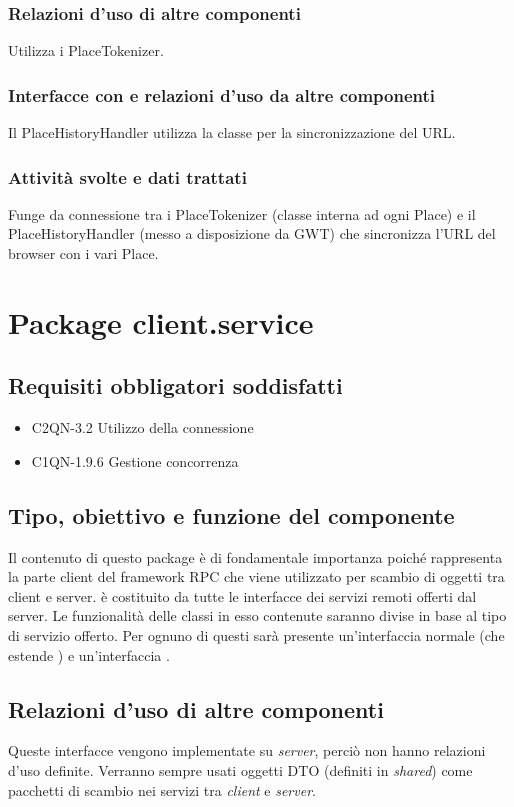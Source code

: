 \subsubsection*{Relazioni d'uso di altre componenti}
Utilizza i PlaceTokenizer.
\subsubsection*{Interfacce con e relazioni d'uso da altre componenti}
Il PlaceHistoryHandler utilizza la classe per la sincronizzazione del URL.
\subsubsection*{Attivit\`a svolte e dati trattati}
Funge da connessione tra i PlaceTokenizer (classe interna ad ogni Place) e il
PlaceHistoryHandler (messo a disposizione da GWT) che sincronizza l'URL del
browser con i vari Place.

\newpage
\section{Package client.service} %
\subsection*{Requisiti obbligatori soddisfatti}
\begin{itemize}
	\item C2QN-3.2 Utilizzo della connessione
	\item C1QN-1.9.6 Gestione concorrenza
\end{itemize}
\subsection*{Tipo, obiettivo e funzione del componente}
Il contenuto di questo package \`e di fondamentale importanza poich\'e
rappresenta la parte client del framework RPC che viene utilizzato per scambio
di oggetti tra client e server.  \`e costituito da tutte
le interfacce dei servizi remoti offerti dal server. Le funzionalit\`a delle
classi in esso contenute saranno divise in base al tipo di servizio offerto. Per
ognuno di questi sar\`a presente un'interfaccia normale (che estende
) e un'interfaccia .

\subsection*{Relazioni d'uso di altre componenti}
Queste interfacce vengono implementate su \emph{server}, perci\`o non
hanno relazioni d'uso definite. Verranno sempre usati oggetti DTO (definiti in
\emph{shared}) come pacchetti di scambio nei servizi tra \emph{client} e
\emph{server}.


